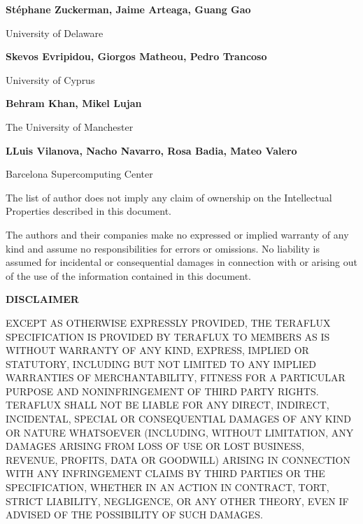 \documentclass[a4paper]{article}
\begin{document}
{\bigskip

{\centering{}
\textbf{St\'ephane Zuckerman, Jaime Arteaga, Guang Gao}
\par}

{\centering{}
University of Delaware
\par}


\bigskip

{\centering{}
\textbf{Skevos Evripidou, Giorgos Matheou, Pedro Trancoso}
\par}

{\centering{}
University of Cyprus
\par}


\bigskip

{\centering{}\bfseries
Behram Khan, Mikel Lujan
\par}

{\centering{}
The University of Manchester
\par}


\bigskip

{\centering{}\bfseries
LLuis Vilanova, Nacho Navarro, Rosa Badia, Mateo Valero 
\par}

{\centering{}
Barcelona Supercomputing Center 
\par}


\bigskip


\bigskip


\bigskip

{
The list of author does not imply any claim of ownership on the
Intellectual Properties described in this document.}

{
The authors and their companies make no expressed or implied warranty of
any kind and assume no responsibilities for errors or omissions. No
liability is assumed for incidental or consequential damages in
connection with or arising out of the use of the information contained
in this document.}


\bigskip

{\bfseries
DISCLAIMER}

{
EXCEPT AS OTHERWISE EXPRESSLY PROVIDED, THE TERAFLUX SPECIFICATION IS
PROVIDED BY TERAFLUX TO MEMBERS {\textquotedbl}AS IS{\textquotedbl}
WITHOUT WARRANTY OF ANY KIND, EXPRESS, IMPLIED OR STATUTORY, INCLUDING
BUT NOT LIMITED TO ANY IMPLIED WARRANTIES OF MERCHANTABILITY, FITNESS
FOR A PARTICULAR PURPOSE AND NONINFRINGEMENT OF THIRD PARTY RIGHTS.
TERAFLUX SHALL NOT BE LIABLE FOR ANY DIRECT, INDIRECT, INCIDENTAL,
SPECIAL OR CONSEQUENTIAL DAMAGES OF ANY KIND OR NATURE WHATSOEVER
(INCLUDING, WITHOUT LIMITATION, ANY DAMAGES ARISING FROM LOSS OF USE OR
LOST BUSINESS, REVENUE, PROFITS, DATA OR GOODWILL) ARISING IN
CONNECTION WITH ANY INFRINGEMENT CLAIMS BY THIRD PARTIES OR THE
SPECIFICATION, WHETHER IN AN ACTION IN CONTRACT, TORT, STRICT
LIABILITY, NEGLIGENCE, OR ANY OTHER THEORY, EVEN IF ADVISED OF THE
POSSIBILITY OF SUCH DAMAGES.}

}
\end{document}

